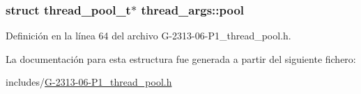 \subsubsection[{\texorpdfstring{pool}{pool}}]{\setlength{\rightskip}{0pt plus 5cm}struct {\bf thread\+\_\+pool\+\_\+t}$\ast$ thread\+\_\+args\+::pool}\hypertarget{structthread__args_a425ced5f77dcbb52f61d240a4e207a27}{}\label{structthread__args_a425ced5f77dcbb52f61d240a4e207a27}


Definición en la línea 64 del archivo G-\/2313-\/06-\/\+P1\+\_\+thread\+\_\+pool.\+h.



La documentación para esta estructura fue generada a partir del siguiente fichero\+:\begin{DoxyCompactItemize}
\item 
includes/\hyperlink{G-2313-06-P1__thread__pool_8h}{G-\/2313-\/06-\/\+P1\+\_\+thread\+\_\+pool.\+h}\end{DoxyCompactItemize}
